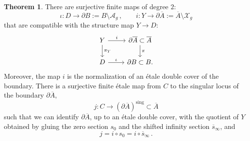 \documentclass[11pt]{article}
\def\A{\mathcal{A}}
\def\X{\mathcal{X}}
\newcommand{\barA}{\overline{A}}
\newcommand{\sbar}{\overline{s}}
\theoremstyle{definition}
\newtheorem{theorem}[definition]{Theorem}
\begin{document}
\begin{theorem}\label{thm:bdy}
    There are surjective finite maps of degree $2$:
    $$
    \iota : D \to \partial B := B \setminus\A_g\, , \qquad i : Y \to \partial \barA := \barA \setminus \X_g
    $$
    that are compatible with the structure map $Y \to D$:
    \begin{equation}\label{eqn:geom_setup}
    \begin{tikzcd}
	{Y} & {\partial \barA \subset \barA} \\
	{D} & {\partial B \subset B.}
	\arrow["i", from=1-1, to=1-2]
	\arrow["\pi_Y", from=1-1, to=2-1]
	\arrow["\pi", from=1-2, to=2-2]
	\arrow["\iota", from=2-1, to=2-2]
    \end{tikzcd}
    \end{equation}
    Moreover, the map $i$ is the normalization of an \'etale double cover of the boundary. There is a surjective finite \'etale map from $C$ to the singular locus of the boundary $\partial \barA$,
    $$
    j: C \to (\partial \barA)^{\mathrm{sing}}\subset \barA
    $$
    such that we can identify $\partial \barA$, up to an \'etale double cover, with the quotient of $Y$ obtained by gluing the zero section $s_0$ and the shifted infinity section $\sbar_\infty$, and
    \begin{equation}\label{eq: j = is0=isinf}
        j = i \circ s_0=i\circ \sbar_{\infty}\, .
    \end{equation}
\end{theorem}
\end{document}
